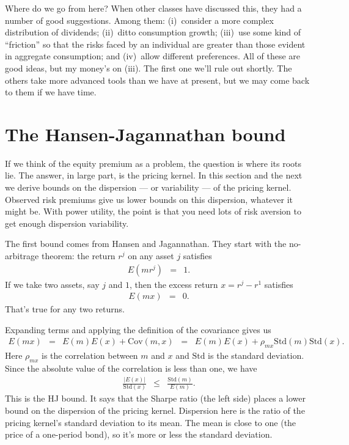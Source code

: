 \documentclass[11pt]{article}
\begin{document}
Where do we go from here?
When other classes have discussed this,
they had a number of good suggestions.
Among them:
(i)~consider a more complex distribution of dividends;
(ii)~ditto consumption growth;
(iii)~use some kind of ``friction'' so that the risks faced by an individual
are greater than those evident in aggregate consumption; and
(iv)~allow different preferences.
All of these are good ideas, but my money's on (iii).
The first one we'll rule out shortly.
The others take more advanced tools than we have at present,
but we may come back to them if we have time.


\section{The Hansen-Jagannathan bound}

If we think of the equity premium as a problem, the question is where its roots lie.
The answer, in large part, is the pricing kernel.
In this section and the next we derive bounds on the dispersion --- or variability --- of the pricing kernel.
Observed risk premiums give us lower bounds on this dispersion,
whatever it might be.
With power utility, the point is that you need lots of risk aversion to get enough dispersion
variability.

The first bound comes from Hansen and Jagannathan.
They start with the no-arbitrage theorem:  the return $r^j$ on any asset $j$ satisfies
\begin{eqnarray}
    E \left( m r^j \right) &=& 1 .
    \label{eq:foc}
\end{eqnarray}
If we take two assets, say $j$ and $1$,
then the excess return $x = r^j - r^1$ satisfies
\begin{eqnarray*}
    E \left( m x \right) &=& 0 .
\end{eqnarray*}
That's true for any two returns.

Expanding terms and applying the definition of the covariance gives us
\begin{eqnarray*}
    E \left( m x \right) &=& E (m) E(x) + \mbox{Cov}(m,x)
            \;\;=\;\; E (m) E(x) + \rho_{mx} \mbox{Std}(m) \mbox{Std}(x) .
\end{eqnarray*}
Here $\rho_{mx}$ is the correlation between $m$ and $x$
and $\mbox{Std}$ is the standard deviation.
Since the absolute value of the correlation is less than one,
we have
\begin{eqnarray}
  \frac{| E(x)|}{ \mbox{Std}(x)} &\leq& \frac{\mbox{Std}(m)}{E(m)} .
  \label{eq:hj-bound}
\end{eqnarray}
This is the HJ bound.
It says that the Sharpe ratio (the left side) places a lower bound
on the dispersion of the pricing kernel.
Dispersion here is the ratio of the pricing kernel's standard deviation to its mean.
The mean is close to one (the price of a one-period bond),
so it's more or less the standard deviation.
\end{document}
